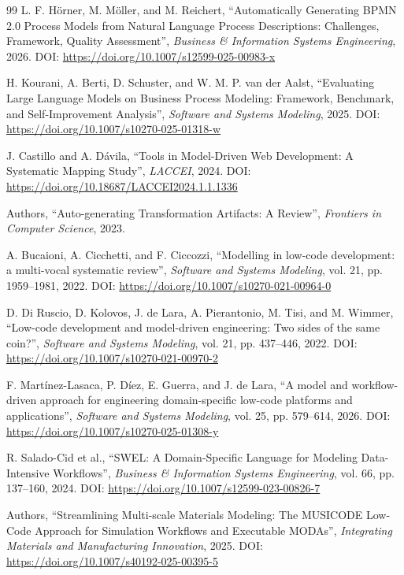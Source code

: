 \documentclass[12pt,a4paper]{article}
\begin{document}
\begin{thebibliography}{99}
L. F. Hörner, M. Möller, and M. Reichert, ``Automatically Generating BPMN 2.0 Process Models from Natural Language Process Descriptions: Challenges, Framework, Quality Assessment'', \textit{Business \& Information Systems Engineering}, 2026. DOI: \url{https://doi.org/10.1007/s12599-025-00983-x}

H. Kourani, A. Berti, D. Schuster, and W. M. P. van der Aalst, ``Evaluating Large Language Models on Business Process Modeling: Framework, Benchmark, and Self-Improvement Analysis'', \textit{Software and Systems Modeling}, 2025. DOI: \url{https://doi.org/10.1007/s10270-025-01318-w}

J. Castillo and A. Dávila, ``Tools in Model-Driven Web Development: A Systematic Mapping Study'', \textit{LACCEI}, 2024. DOI: \url{https://doi.org/10.18687/LACCEI2024.1.1.1336}

Authors, ``Auto-generating Transformation Artifacts: A Review'', \textit{Frontiers in Computer Science}, 2023.

A. Bucaioni, A. Cicchetti, and F. Ciccozzi, ``Modelling in low-code development: a multi-vocal systematic review'', \textit{Software and Systems Modeling}, vol. 21, pp. 1959--1981, 2022. DOI: \url{https://doi.org/10.1007/s10270-021-00964-0}

D. Di Ruscio, D. Kolovos, J. de Lara, A. Pierantonio, M. Tisi, and M. Wimmer, ``Low-code development and model-driven engineering: Two sides of the same coin?'', \textit{Software and Systems Modeling}, vol. 21, pp. 437--446, 2022. DOI: \url{https://doi.org/10.1007/s10270-021-00970-2}

F. Martínez-Lasaca, P. Díez, E. Guerra, and J. de Lara, ``A model and workflow-driven approach for engineering domain-specific low-code platforms and applications'', \textit{Software and Systems Modeling}, vol. 25, pp. 579--614, 2026. DOI: \url{https://doi.org/10.1007/s10270-025-01308-y}

R. Salado-Cid et al., ``SWEL: A Domain-Specific Language for Modeling Data-Intensive Workflows'', \textit{Business \& Information Systems Engineering}, vol. 66, pp. 137--160, 2024. DOI: \url{https://doi.org/10.1007/s12599-023-00826-7}

Authors, ``Streamlining Multi-scale Materials Modeling: The MUSICODE Low-Code Approach for Simulation Workflows and Executable MODAs'', \textit{Integrating Materials and Manufacturing Innovation}, 2025. DOI: \url{https://doi.org/10.1007/s40192-025-00395-5}

\end{thebibliography}
\end{document}
